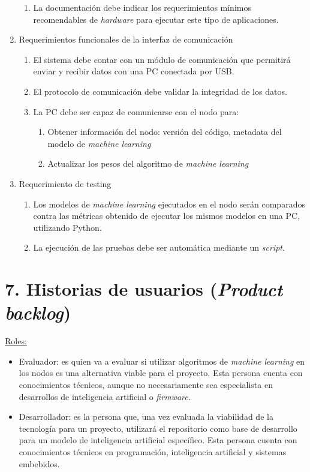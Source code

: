 \documentclass[
11pt, %
codirector, %
]{charter}
\begin{document}
\begin{enumerate}
\begin{enumerate}
			\item La documentación debe indicar los requerimientos mínimos recomendables de \textit{hardware} para ejecutar este tipo de aplicaciones.
		\end{enumerate}
	\item Requerimientos funcionales de la interfaz de comunicación
		\begin{enumerate}
		\item El sistema debe contar con un módulo de comunicación que permitirá enviar y recibir datos con una PC conectada por USB.
		\item El protocolo de comunicación debe validar la integridad de los datos.
		\item La PC debe ser capaz de comunicarse con el nodo para:
			\begin{enumerate}
				\item Obtener información del nodo: versión del código, metadata del modelo de \textit{machine learning}
				\item Actualizar los pesos del algoritmo de \textit{machine learning}
			\end{enumerate}
		\end{enumerate}
	\item Requerimiento de testing
		\begin{enumerate}
			\item Los modelos de \textit{machine learning} ejecutados en el nodo serán comparados contra las métricas obtenido de ejecutar los mismos modelos en una PC, utilizando Python.
			\item La ejecución de las pruebas debe ser automática mediante un \textit{script}.
		\end{enumerate}
\end{enumerate}

\section{7. Historias de usuarios (\textit{Product backlog})}
\label{sec:backlog}

\underline{Roles:} 
\begin{itemize}
\item Evaluador: es quien va a evaluar si utilizar algoritmos de \textit{machine learning} en los nodos es una alternativa viable para el proyecto. Esta persona cuenta con conocimientos técnicos, aunque no necesariamente sea especialista en desarrollos de inteligencia artificial o \textit{firmware}.
\item Desarrollador: es la persona que, una vez evaluada la viabilidad de la tecnología para un proyecto, utilizará el repositorio como base de desarrollo para un modelo de inteligencia artificial específico. Esta persona cuenta con conocimientos técnicos en programación, inteligencia artificial y sistemas embebidos.
\end{itemize}
\end{document}
